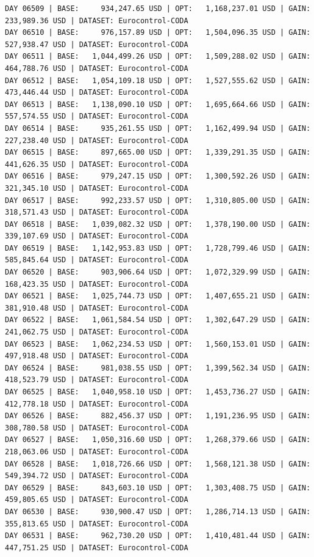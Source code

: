\documentclass[11pt,a4paper]{article}
\begin{document}
\begin{verbatim}
DAY 06509 | BASE:     934,247.65 USD | OPT:   1,168,237.01 USD | GAIN: 233,989.36 USD | DATASET: Eurocontrol-CODA
DAY 06510 | BASE:     976,157.89 USD | OPT:   1,504,096.35 USD | GAIN: 527,938.47 USD | DATASET: Eurocontrol-CODA
DAY 06511 | BASE:   1,044,499.26 USD | OPT:   1,509,288.02 USD | GAIN: 464,788.76 USD | DATASET: Eurocontrol-CODA
DAY 06512 | BASE:   1,054,109.18 USD | OPT:   1,527,555.62 USD | GAIN: 473,446.44 USD | DATASET: Eurocontrol-CODA
DAY 06513 | BASE:   1,138,090.10 USD | OPT:   1,695,664.66 USD | GAIN: 557,574.55 USD | DATASET: Eurocontrol-CODA
DAY 06514 | BASE:     935,261.55 USD | OPT:   1,162,499.94 USD | GAIN: 227,238.40 USD | DATASET: Eurocontrol-CODA
DAY 06515 | BASE:     897,665.00 USD | OPT:   1,339,291.35 USD | GAIN: 441,626.35 USD | DATASET: Eurocontrol-CODA
DAY 06516 | BASE:     979,247.15 USD | OPT:   1,300,592.26 USD | GAIN: 321,345.10 USD | DATASET: Eurocontrol-CODA
DAY 06517 | BASE:     992,233.57 USD | OPT:   1,310,805.00 USD | GAIN: 318,571.43 USD | DATASET: Eurocontrol-CODA
DAY 06518 | BASE:   1,039,082.32 USD | OPT:   1,378,190.00 USD | GAIN: 339,107.69 USD | DATASET: Eurocontrol-CODA
DAY 06519 | BASE:   1,142,953.83 USD | OPT:   1,728,799.46 USD | GAIN: 585,845.64 USD | DATASET: Eurocontrol-CODA
DAY 06520 | BASE:     903,906.64 USD | OPT:   1,072,329.99 USD | GAIN: 168,423.35 USD | DATASET: Eurocontrol-CODA
DAY 06521 | BASE:   1,025,744.73 USD | OPT:   1,407,655.21 USD | GAIN: 381,910.48 USD | DATASET: Eurocontrol-CODA
DAY 06522 | BASE:   1,061,584.54 USD | OPT:   1,302,647.29 USD | GAIN: 241,062.75 USD | DATASET: Eurocontrol-CODA
DAY 06523 | BASE:   1,062,234.53 USD | OPT:   1,560,153.01 USD | GAIN: 497,918.48 USD | DATASET: Eurocontrol-CODA
DAY 06524 | BASE:     981,038.55 USD | OPT:   1,399,562.34 USD | GAIN: 418,523.79 USD | DATASET: Eurocontrol-CODA
DAY 06525 | BASE:   1,040,958.10 USD | OPT:   1,453,736.27 USD | GAIN: 412,778.18 USD | DATASET: Eurocontrol-CODA
DAY 06526 | BASE:     882,456.37 USD | OPT:   1,191,236.95 USD | GAIN: 308,780.58 USD | DATASET: Eurocontrol-CODA
DAY 06527 | BASE:   1,050,316.60 USD | OPT:   1,268,379.66 USD | GAIN: 218,063.06 USD | DATASET: Eurocontrol-CODA
DAY 06528 | BASE:   1,018,726.66 USD | OPT:   1,568,121.38 USD | GAIN: 549,394.72 USD | DATASET: Eurocontrol-CODA
DAY 06529 | BASE:     843,603.10 USD | OPT:   1,303,408.75 USD | GAIN: 459,805.65 USD | DATASET: Eurocontrol-CODA
DAY 06530 | BASE:     930,900.47 USD | OPT:   1,286,714.13 USD | GAIN: 355,813.65 USD | DATASET: Eurocontrol-CODA
DAY 06531 | BASE:     962,730.20 USD | OPT:   1,410,481.44 USD | GAIN: 447,751.25 USD | DATASET: Eurocontrol-CODA

\end{verbatim}
\end{document}
